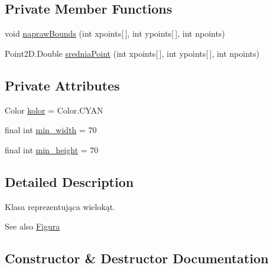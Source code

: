 \subsection*{Private Member Functions}
\begin{DoxyCompactItemize}
\item 
void \mbox{\hyperlink{classlista__5_1_1_wielokat_ab8e8d6236a7e73b426c6504af3b59f5f}{napraw\+Bounds}} (int xpoints\mbox{[}$\,$\mbox{]}, int ypoints\mbox{[}$\,$\mbox{]}, int npoints)
\item 
Point2\+D.\+Double \mbox{\hyperlink{classlista__5_1_1_wielokat_a8498454fc73a25ba038d48e04bb1e8c0}{srednia\+Point}} (int xpoints\mbox{[}$\,$\mbox{]}, int ypoints\mbox{[}$\,$\mbox{]}, int npoints)
\end{DoxyCompactItemize}
\subsection*{Private Attributes}
\begin{DoxyCompactItemize}
\item 
Color \mbox{\hyperlink{classlista__5_1_1_wielokat_a6804efa88b78068f50c71ba760dcccc5}{kolor}} = Color.\+C\+Y\+AN
\item 
final int \mbox{\hyperlink{classlista__5_1_1_wielokat_a362cfa49edf4875e534bb1f95a59e7af}{min\+\_\+width}} = 70
\item 
final int \mbox{\hyperlink{classlista__5_1_1_wielokat_a0aa7a67f7c10f26e3bf9f4444e5ecb65}{min\+\_\+height}} = 70
\end{DoxyCompactItemize}


\subsection{Detailed Description}
Klasa reprezentująca wielokąt. \begin{DoxySeeAlso}{See also}
\mbox{\hyperlink{interfacelista__5_1_1_figura}{Figura}} 
\end{DoxySeeAlso}


\subsection{Constructor \& Destructor Documentation}
\mbox{\label{classlista__5_1_1_wielokat_a902f38459eb1935a604537d621f5ca6b}} 
